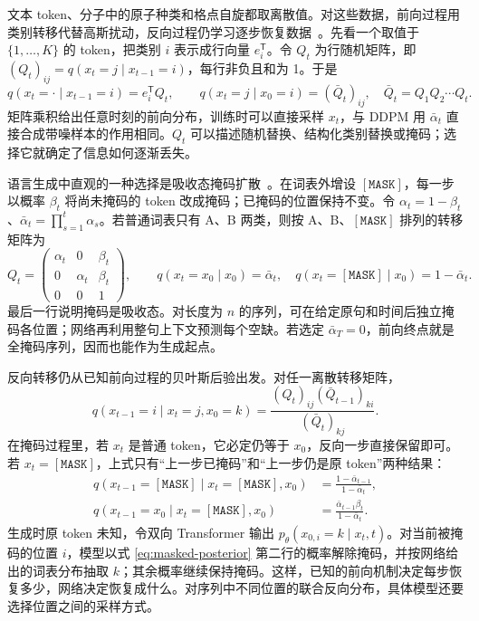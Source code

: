 文本 token、分子中的原子种类和格点自旋都取离散值。对这些数据，前向过程用类别转移代替高斯扰动，反向过程仍学习逐步恢复数据~\cite{austin2021d3pm}。先看一个取值于 \(\{1,\ldots,K\}\) 的 token，把类别 \(i\) 表示成行向量 \(e_i^{\mathsf T}\)。令 \(Q_t\) 为行随机矩阵，即 \((Q_t)_{ij}=q(x_t=j\mid x_{t-1}=i)\)，每行非负且和为 1。于是
\begin{equation}
 q(x_t=\cdot\mid x_{t-1}=i)=e_i^{\mathsf T}Q_t,\qquad
 q(x_t=j\mid x_0=i)=(\bar Q_t)_{ij},\quad
 \bar Q_t=Q_1Q_2\cdots Q_t.
 \label{eq:discrete-forward}
\end{equation}
矩阵乘积给出任意时刻的前向分布，训练时可以直接采样 \(x_t\)，与 DDPM 用 \(\bar\alpha_t\) 直接合成带噪样本的作用相同。\(Q_t\) 可以描述随机替换、结构化类别替换或掩码；选择它就确定了信息如何逐渐丢失。

语言生成中直观的一种选择是吸收态掩码扩散~\cite{sahoo2024mdlm}。在词表外增设 \(\mathtt{[MASK]}\)，每一步以概率 \(\beta_t\) 将尚未掩码的 token 改成掩码；已掩码的位置保持不变。令 \(\alpha_t=1-\beta_t\)、\(\bar\alpha_t=\prod_{s=1}^t\alpha_s\)。若普通词表只有 A、B 两类，则按 A、B、\(\mathtt{[MASK]}\) 排列的转移矩阵为
\begin{equation}
 Q_t=\begin{pmatrix}
 \alpha_t&0&\beta_t\\
 0&\alpha_t&\beta_t\\
 0&0&1
 \end{pmatrix},\qquad
 q(x_t=x_0\mid x_0)=\bar\alpha_t,\quad
 q(x_t=\mathtt{[MASK]}\mid x_0)=1-\bar\alpha_t.
 \label{eq:masked-forward}
\end{equation}
最后一行说明掩码是吸收态。对长度为 \(n\) 的序列，可在给定原句和时间后独立掩码各位置；网络再利用整句上下文预测每个空缺。若选定 \(\bar\alpha_T=0\)，前向终点就是全掩码序列，因而也能作为生成起点。

反向转移仍从已知前向过程的贝叶斯后验出发。对任一离散转移矩阵，
\begin{equation}
 q(x_{t-1}=i\mid x_t=j,x_0=k)
 =\frac{(Q_t)_{ij}(\bar Q_{t-1})_{ki}}{(\bar Q_t)_{kj}}.
 \label{eq:discrete-posterior}
\end{equation}
在掩码过程里，若 \(x_t\) 是普通 token，它必定仍等于 \(x_0\)，反向一步直接保留即可。若 \(x_t=\mathtt{[MASK]}\)，上式只有“上一步已掩码”和“上一步仍是原 token”两种结果：
\begin{equation}
 \begin{aligned}
 q(x_{t-1}=\mathtt{[MASK]}\mid x_t=\mathtt{[MASK]},x_0)
 &=\frac{1-\bar\alpha_{t-1}}{1-\bar\alpha_t},\\
 q(x_{t-1}=x_0\mid x_t=\mathtt{[MASK]},x_0)
 &=\frac{\bar\alpha_{t-1}\beta_t}{1-\bar\alpha_t}.
 \end{aligned}
 \label{eq:masked-posterior}
\end{equation}
生成时原 token 未知，令双向 Transformer 输出 \(p_\theta(x_{0,i}=k\mid x_t,t)\)。对当前被掩码的位置 \(i\)，模型以式 \eqref{eq:masked-posterior} 第二行的概率解除掩码，并按网络给出的词表分布抽取 \(k\)；其余概率继续保持掩码。这样，已知的前向机制决定每步恢复多少，网络决定恢复成什么。对序列中不同位置的联合反向分布，具体模型还要选择位置之间的采样方式。

